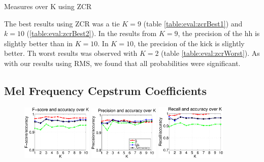 {\begin{table}
			\caption{Measures over K using ZCR}
		\end{table}
		
		The best results using ZCR was a tie $K=9$ (table \ref{table:eval:zcrBest1}) and $k=10$ (\ref{table:eval:zcrBest2}). In the results from $K=9$, the precision of the hh is slightly better than in $K=10$. In $K=10$, the precision of the kick is slightly better.
		Th worst results was observed with $K=2$ (table \ref{table:eval:zcrWorst}). As with our results using RMS, we found that all probabilities were significant.
		
		
	\subsection{Mel Frequency Cepstrum Coefficients}
		\begin{figure}
			\centering\includegraphics[width=0.3\textwidth]{tex/appendices/test/mfcc2010FP.png}
			\centering\includegraphics[width=0.3\textwidth]{tex/appendices/test/mfcc2010_P.png}
			\centering\includegraphics[width=0.3\textwidth]{tex/appendices/test/mfcc2010_R.png}
			

\end{figure}}

